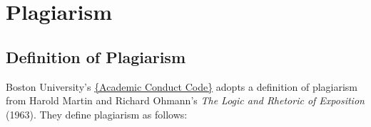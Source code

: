 

\chapter{Plagiarism}

\section{Definition of Plagiarism}

Boston University's \href{http://www.bu.edu/academics/resources/academic-conduct-code/}{\{Academic Conduct Code\}} adopts a definition of plagiarism from Harold Martin and Richard Ohmann's \emph{The Logic and Rhetoric of Exposition} (1963). They define plagiarism as follows:

